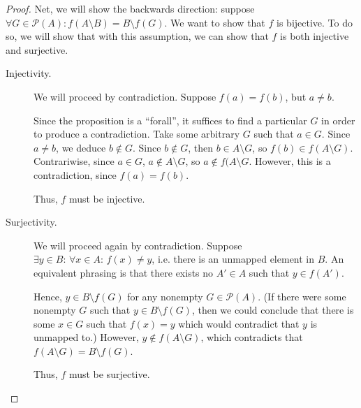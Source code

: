 \documentclass[11pt,letterpaper]{article}
\begin{document}
\begin{proof}
    Net, we will show the backwards direction: suppose
    $\forall G \in \mathcal{P}(A): f(A \setminus B) = B \setminus f(G)$. We
    want to show that $f$ is bijective. To do so, we will show that with this
    assumption, we can show that $f$ is both injective and surjective.

    \begin{description}
        \item[Injectivity.] We will proceed by contradiction.
            Suppose $f(a) = f(b)$, but $a \neq b$.

            Since the proposition is a ``forall'', it suffices to find a
            particular $G$ in order to produce a contradiction. Take some
            arbitrary $G$ such that $a \in G$. Since $a \neq b$, we deduce
            $b \notin G$. Since $b \notin G$, then $b \in A \setminus G$, so
            $f(b) \in f(A \setminus G)$. Contrariwise, since $a \in G$,
            $a \notin A \setminus G$, so $a \notin f(A \setminus G$. However,
            this is a contradiction, since $f(a) = f(b)$.

            Thus, $f$ must be injective.

        \item[Surjectivity.] We will proceed again by contradiction.
            Suppose $\exists y \in B:\, \forall x \in A:\, f(x) \neq y$, i.e.
            there is an unmapped element in $B$. An equivalent phrasing is that
            there exists no $A\prime \in A$ such that $y \in f(A\prime)$.

            Hence, $y \in B \setminus f(G)$ for any nonempty
            $G \in \mathcal{P}(A)$. (If there were some nonempty $G$ such that
            $y \in B \setminus f(G)$, then we could conclude that there is some
            $x \in G$ such that $f(x) = y$ which would contradict that $y$ is
            unmapped to.) However, $y \notin f(A \setminus G)$, which
            contradicts that $f(A \setminus G) = B \setminus f(G)$.

            Thus, $f$ must be surjective.
    \end{description}
\end{proof}
\end{document}
